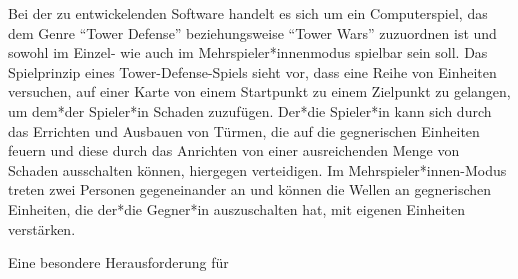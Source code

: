 \documentclass[enabledeprecatedfontcommands,fontsize=12pt,paper=a4,twoside,parskip=half]{scrartcl}
\begin{document}
Bei der zu entwickelenden Software handelt es sich um ein Computerspiel, das dem Genre \enquote{Tower Defense} beziehungsweise \enquote{Tower Wars} zuzuordnen ist und sowohl im Einzel- wie auch im Mehrspieler*innenmodus spielbar sein soll. Das Spielprinzip eines Tower-Defense-Spiels sieht vor, dass eine Reihe von Einheiten versuchen, auf einer Karte von einem Startpunkt zu einem Zielpunkt zu gelangen, um dem*der Spieler*in Schaden zuzufügen. Der*die Spieler*in kann sich durch das Errichten und Ausbauen von Türmen, die auf die gegnerischen Einheiten feuern und diese durch das Anrichten von einer ausreichenden Menge von Schaden ausschalten können, hiergegen verteidigen. Im Mehrspieler*innen-Modus treten zwei Personen gegeneinander an und können die Wellen an gegnerischen Einheiten, die der*die Gegner*in auszuschalten hat, mit eigenen Einheiten verstärken. 

Eine besondere Herausforderung für 


\end{document}

